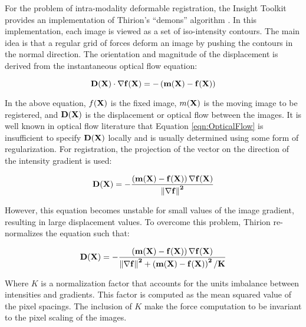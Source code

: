 %
%
%
%
%
%

For the problem of intra-modality deformable registration, the Insight
Toolkit provides an implementation of Thirion's ``demons'' algorithm
\cite{Thirion1995b,Thirion1998}. 
In this implementation, each image is viewed as a set of iso-intensity
contours.  The main idea is that a regular grid of forces deform an image by
pushing the contours in the normal direction.  The orientation and magnitude
of the displacement is derived from the instantaneous optical flow equation:

\begin{equation}
\bf{D}(\bf{X}) \cdot \nabla f(\bf{X}) = - \left(m(\bf{X}) - f(\bf{X}) \right)
\label{eqn:OpticalFlow}
\end{equation}

In the above equation, $f(\bf{X})$ is the fixed image, $m(\bf{X})$
is the moving image to be registered, and $\bf{D}(\bf{X})$ is the displacement 
or optical flow between the images. It is well known in optical flow
literature that Equation \ref{eqn:OpticalFlow} is insufficient to specify 
$\bf{D}(\bf{X})$ locally and is usually determined using some form of
regularization. For registration, the projection of the vector on the
direction of the intensity gradient is used:

\begin{equation}
\bf{D}(\bf{X}) = - \frac
{\left(  m(\bf{X}) - f(\bf{X}) \right) \nabla f(\bf{X})}
{\left\|  \nabla f \right\|^2 } 
\end{equation}

However, this equation becomes unstable for small values of the image gradient,
resulting in large displacement values. To overcome this problem, Thirion
re-normalizes the equation such that:

\begin{equation}
\bf{D}(\bf{X}) = - \frac
{\left(  m(\bf{X}) - f(\bf{X}) \right) \nabla f(\bf{X})}
{\left\|  \nabla f \right\|^2 + \left(  m(\bf{X}) - f(\bf{X}) \right)^2 / K } 
\label{eqn:DemonsDisplacement}
\end{equation}

Where $K$ is a normalization factor that accounts for the units imbalance
between intensities and gradients. This factor is computed as the mean squared
value of the pixel spacings. The inclusion of $K$ make the force computation to
be invariant to the pixel scaling of the images.

